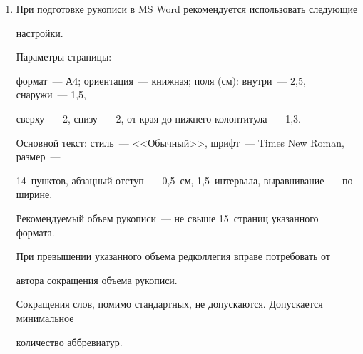 {\begin{enumerate}[1.]
или электронной почтой. Предоставление бумажной рукописи необязательно.\\[-13.5pt]





\item При подготовке рукописи в MS Word рекомендуется использовать следующие


настройки.





Параметры страницы:


формат~--- А4; ориентация~--- книжная; поля (см): внутри~--- 2,5, снаружи~--- 1,5,


сверху~--- 2, снизу~--- 2, от края до нижнего колонтитула~--- 1,3.





Основной текст: стиль~--- <<Обычный>>, шрифт~--- Times New Roman, размер~---


14~пунк\-тов, абзацный отступ~--- 0,5~см, 1,5~интервала, выравнивание~--- по ширине.





\pagebreak





\def\leftkol{\ } %







\def\rightkol{\ }












Рекомендуемый объем рукописи~--- не свыше 15~страниц указанного формата.


При превышении указанного объема редколлегия вправе потребовать от 


автора сокращения объема рукописи.





Сокращения слов, помимо стандартных, не допускаются. Допускается минимальное


количество аббревиатур.






\end{enumerate}}
